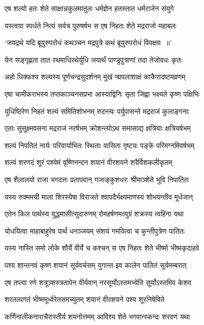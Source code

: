 \twolineshloka
{एष शल्यो हतः शेते साक्षान्नकुलमातुलः}
{धर्मज्ञेन हतस्तात धर्मराजेन संयुगे}


\twolineshloka
{यस्त्वया स्पर्धते नित्यं सर्वत्र पुरुषर्षभ}
{स एष निहतः शेते मद्रराजो महाबलः}


\twolineshloka
{`जयद्रथे यदि ब्रूयुरुपरोधं कथञ्चन}
{मद्रपुत्रे कथं ब्रूयुरुपरोधं विवक्षवः ॥'}


\twolineshloka
{येन सङ्गृह्णता तात रथमाधिरथेर्युधि}
{जयार्थं पाण्डुपुत्राणां तदा तेजोवधः कृतः}


\twolineshloka
{अहो धिक्फश्य शल्यस्य पूर्णचन्द्रसुदर्शनम्}
{मुखं प्द्मपलाशाक्षं काकैरादष्टमव्रणम्}


\twolineshloka
{एषा चामीकराभस्य तप्तकाञ्चनसप्रभा}
{आस्याद्विनिः सृता जिह्वा भक्ष्यते कृष्ण पक्षिभिः}


\twolineshloka
{युधिष्ठिरेण निहतं शल्यं समितिशोभनम्}
{रुदन्त्यः पर्युपासन्ते मद्रराजं कुलाङ्गनाः}


\twolineshloka
{एताः सुसूक्ष्मवसना मद्रराजं नरर्षभम्}
{क्रोशन्त्योऽथ समासाद्य क्षत्रियाः क्षत्रियर्षभम्}


\twolineshloka
{शल्यं निपतितं नार्यः परिवार्याभितः स्थिताः}
{वासिता गृष्टयः पङ्के परिमग्नमिवर्षभम्}


\twolineshloka
{शल्यं शरणदं शूरं पश्येमं वृष्णिनन्दन}
{शयानं वीरशयने शरैर्विशकलीकृतम्}


\twolineshloka
{एष शैलालयो राजा भगदत्तः प्रतापवान्}
{गजाङ्कुशधरः श्रीमाञ्शेते भुवि निपातितः}


\twolineshloka
{यस्य रुक्ममयी माला शिरस्येषा विराजते}
{श्वापदैर्भक्ष्यमाणस्य शोभयन्तीव मूर्धजान्}


\twolineshloka
{एतेन किल पार्थस्य युद्धमासीत्सुदारुणम्}
{रोमहर्षणमत्युग्रं शक्रस्य त्वहिना यथा}


\twolineshloka
{योधयित्वा माहाबाहुरेष पार्थं धनञ्जयम्}
{संशयं गमयित्वा च कुन्तीपुत्रेण पातितः}


\twolineshloka
{यस्य नास्ति समो लोके शौर्ये वीर्ये च कश्चन्}
{स एष निहतः शेते भीष्मो भीष्मकृदाहवे}


\twolineshloka
{पश्य शान्तनवं कृष्ण शयानं सूर्यवर्चसम्}
{युगान्त इव कालेन पातितं सूर्यमम्बरात्}


\twolineshloka
{एष तप्त्वा रणे शत्रूञ्शस्त्रतापेन वीर्यवान्}
{नरसूर्योऽस्तमभ्येति सूर्योऽस्तमिव केशव}


\twolineshloka
{शरतल्पगतं भीष्ममूर्ध्वरेतसमच्युतम्}
{शयानं वीरशयने पश्य शूरनिषेविते}


\twolineshloka
{कर्णिनालीकनाराचैरास्तीर्य शयनोत्तमम्}
{आविश्य शेते भगवान्स्कन्दः शरवणं यथा}


